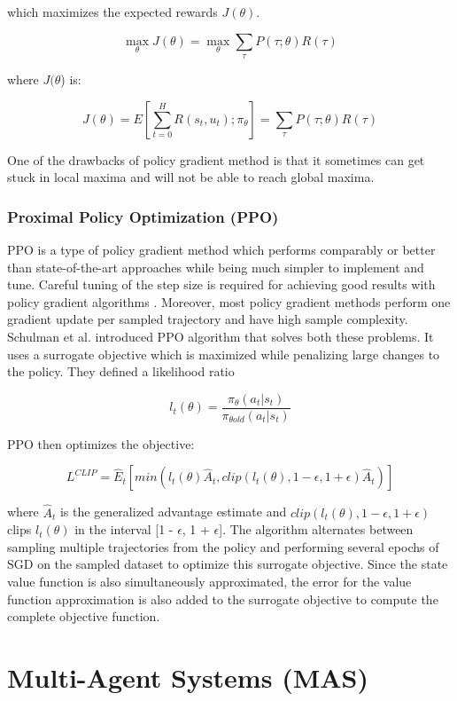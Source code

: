 \documentclass[12pt]{report}
\begin{document}
which maximizes the expected rewards $J(\theta)$. 

\[ \max_{\theta} J(\theta ) = \max_{\theta} \sum_{\tau} P(\tau;\theta) R(\tau)  \] 

where $J(\theta$) is:

\[ J(\theta) = E[\sum_{t=0}^{H} R(s_t, u_t); \pi_\theta] = \sum_{\tau} P(\tau;\theta) R(\tau) \] 

One of the drawbacks of policy gradient method is that it sometimes can get stuck in local maxima and will not be able to reach global maxima. 

\subsubsection{Proximal Policy Optimization (PPO)} PPO is a type of policy gradient method which performs  comparably or better than state-of-the-art approaches while being much simpler to implement and tune. Careful tuning of the step size is required for achieving good results with policy gradient algorithms \cite{PPO}. Moreover, most policy gradient methods perform one gradient update per sampled trajectory and have high sample complexity. Schulman et al. \cite{Schulman} introduced PPO algorithm that solves both these problems. It uses a surrogate objective which is maximized while penalizing large changes to the policy. 
They defined a likelihood ratio 

\[ l_t(\theta) = \frac{\pi_\theta(a_t | s_t)}{\pi_{\theta old}(a_t | s_t)}\]

\hfill \break
PPO then optimizes the objective: 

\[ L^{CLIP} = \hat{E}_t [min(l_t(\theta) \hat{A}_t, clip(l_t (\theta) , 1- \epsilon , 1+\epsilon)\hat{A}_t)] \]

\hfill \break
where $\hat{A}_t$ is the generalized advantage estimate and $clip(l_t (\theta) , 1- \epsilon , 1+\epsilon)$ clips $l_t(\theta)$ in the interval [1 - $\epsilon$, 1 + $\epsilon$]. The algorithm alternates between sampling multiple trajectories from the policy and performing several epochs of SGD on the
sampled dataset to optimize this surrogate objective. Since the state value function is also simultaneously approximated, the error for the value function approximation is also added to the surrogate
objective to compute the complete objective function. 

\section{Multi-Agent Systems (MAS)} \label{MAS}
\end{document}
